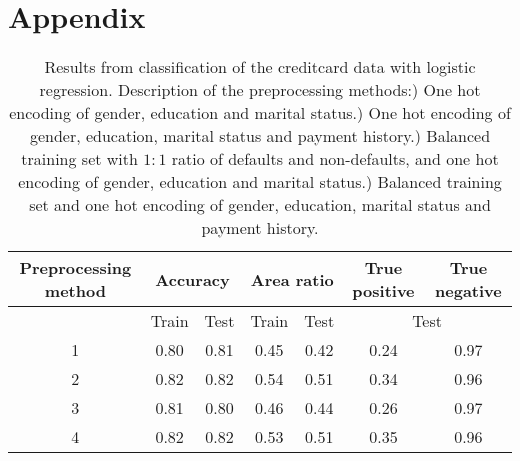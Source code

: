 \section{Appendix}\label{sec:Appendix}


\begin{table}[]
\label{tab:appendix_results_classification}
\caption{Results from classification of the creditcard data with logistic regression. Description of the preprocessing methods:) One hot encoding of gender, education and marital status.) One hot encoding of gender, education, marital status and payment history.) Balanced training set with $1:1$ ratio of defaults and non-defaults, and one hot encoding of gender, education and marital status.) Balanced training set and one hot encoding of gender, education, marital status and payment history.}
\begin{tabular}{|c|c|c|c|c|c|c|}
\hline
Preprocessing method & \multicolumn{2}{c|}{Accuracy} & \multicolumn{2}{c|}{Area ratio} & True positive & True negative \\ \hline
                     & Train          & Test         & Train           & Test          & \multicolumn{2}{c|}{Test}     \\ \hline
1                    & 0.80           & 0.81         & 0.45            & 0.42          & 0.24          & 0.97          \\ \hline
2                    & 0.82           & 0.82         & 0.54            & 0.51          & 0.34          & 0.96          \\ \hline
3                    & 0.81           & 0.80         & 0.46            & 0.44          & 0.26          & 0.97          \\ \hline
4                    & 0.82           & 0.82         & 0.53            & 0.51          & 0.35          & 0.96          \\ \hline
\end{tabular}
\end{table}